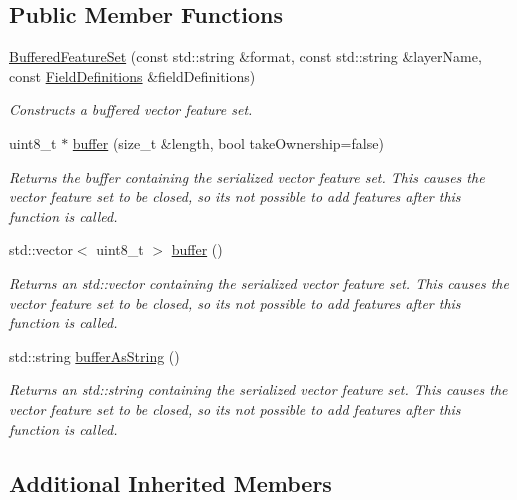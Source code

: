 \subsection*{Public Member Functions}
\begin{DoxyCompactItemize}
\item 
\hyperlink{group___vector_module_ga13bed828345853b15d61ba90d6df392e}{Buffered\+Feature\+Set} (const std\+::string \&format, const std\+::string \&layer\+Name, const \hyperlink{namespacedg_1_1deepcore_1_1vector_a89a39c2fa657ff95f116cfed4a951386}{Field\+Definitions} \&field\+Definitions)
\begin{DoxyCompactList}\small\item\em Constructs a buffered vector feature set. \end{DoxyCompactList}\item 
uint8\+\_\+t $\ast$ \hyperlink{group___vector_module_ga3541fd309ad0269dbdb1a64657a5a11d}{buffer} (size\+\_\+t \&length, bool take\+Ownership=false)
\begin{DoxyCompactList}\small\item\em Returns the buffer containing the serialized vector feature set. This causes the vector feature set to be closed, so it\textquotesingle{}s not possible to add features after this function is called. \end{DoxyCompactList}\item 
std\+::vector$<$ uint8\+\_\+t $>$ \hyperlink{group___vector_module_ga0a390de9fa273210eb7d905538d22b19}{buffer} ()
\begin{DoxyCompactList}\small\item\em Returns an std\+::vector containing the serialized vector feature set. This causes the vector feature set to be closed, so it\textquotesingle{}s not possible to add features after this function is called. \end{DoxyCompactList}\item 
std\+::string \hyperlink{group___vector_module_gaa41d91dcbee14ef2363b9acecb332b1f}{buffer\+As\+String} ()
\begin{DoxyCompactList}\small\item\em Returns an std\+::string containing the serialized vector feature set. This causes the vector feature set to be closed, so it\textquotesingle{}s not possible to add features after this function is called. \end{DoxyCompactList}\end{DoxyCompactItemize}
\subsection*{Additional Inherited Members}
